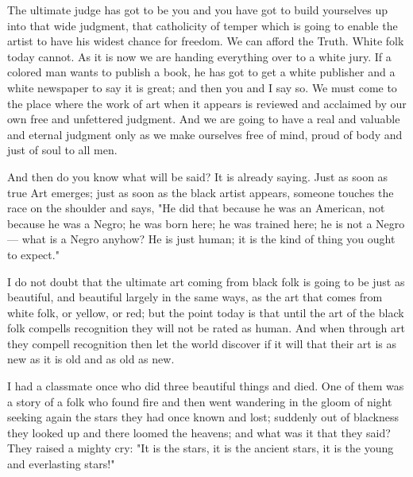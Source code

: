 \documentclass[12pt]{article}
\begin{document}
{\duboispara}%
The ultimate judge has got to be you and you have got to build yourselves up into that wide judgment, that catholicity of temper which is going to enable the artist to have his widest chance for freedom. We can afford the Truth. White folk today cannot. As it is now we are handing everything over to a white jury. If a colored man wants to publish a book, he has got to get a white publisher and a white newspaper to say it is great; and then you and I say so. We must come to the place where the work of art when it appears is reviewed and acclaimed by our own free and unfettered judgment. And we are going to have a real and valuable and eternal judgment only as we make ourselves free of mind, proud of body and just of soul to all men. 

{\duboispara}%
And then do you know what will be said? It is already saying. Just as soon as true Art emerges; just as soon as the black artist appears, someone touches the race on the shoulder and says, "He did that because he was an American, not because he was a Negro; he was born here; he was trained here; he is not a Negro --- what is a Negro anyhow? He is just human; it is the kind of thing you ought to expect." 

{\duboispara}%
I do not doubt that the ultimate art coming from black folk is going to be just as beautiful, and beautiful largely in the same ways, as the art that comes from white folk, or yellow, or red; but the point today is that until the art of the black folk compells recognition they will not be rated as human. And when through art they compell recognition then let the world discover if it will that their art is as new as it is old and as old as new. 

{\duboispara}%
I had a classmate once who did three beautiful things and died. One of them was a story of a folk who found fire and then went wandering in the gloom of night seeking again the stars they had once known and lost; suddenly out of blackness they looked up and there loomed the heavens; and what was it that they said? They raised a mighty cry: "It is the stars, it is the ancient stars, it is the young and everlasting stars!" 

\end{document}
